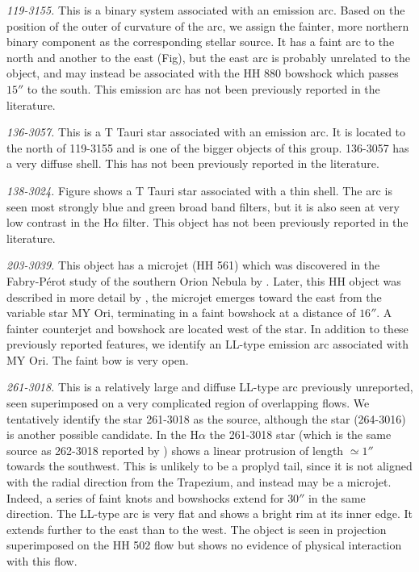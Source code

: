 \documentclass{article}
\newcommand\ha{\ensuremath{\mathrm{H}\alpha}}
\begin{document}
\textit{119-3155.} This is a binary system  associated with an emission arc. Based on the position of the outer of curvature of the arc, we assign the fainter, more northern binary component as the corresponding stellar source. It has a faint arc to the north and another to the east (Fig), but  the east arc is probably unrelated to the object, and may instead be associated with the HH 880 bowshock which passes \(15''\) to the south. This emission arc has not been previously reported in the literature.     

\textit{136-3057.} This is a T Tauri star associated with an emission arc. It is located to the north of 119-3155 and is one of the bigger objects of this group. 136-3057 has a very diffuse shell. This has not been previously reported in the literature.

\textit{138-3024.} Figure shows a T Tauri star associated with a thin shell. The arc is seen most strongly blue and green broad band filters, but it is also seen at very low contrast in the \ha{} filter. This object has not been previously reported in the literature.

\textit{203-3039.} This object has a microjet (HH 561) which was discovered in the Fabry-Pérot study of the southern Orion Nebula by \citet{Bally:2001}. Later, this HH object was described in more detail by \citet{Bally:2006a}, the microjet emerges toward the east from the variable star MY Ori, terminating in a faint bowshock at a distance of \(16''\). A fainter counterjet and bowshock are located west of the star. In addition to these previously reported features, we identify an LL-type emission arc associated with MY Ori. The faint bow is very open.

\textit{261-3018.} This is a relatively large and diffuse LL-type arc previously unreported, seen superimposed on a very complicated region of overlapping flows. We tentatively identify the star 261-3018 as the source, although the star (264-3016) is another possible candidate. In the \ha{} the 261-3018 star (which is the same source as 262-3018 reported by \citealp{Bally:2006a})  shows a linear protrusion of length \(\simeq1''\) towards the southwest. This is unlikely to be a proplyd tail, since it is not aligned with the radial direction from the Trapezium, and instead may be a microjet. Indeed, a series of faint knots and bowshocks extend for \(30''\) in the same direction. The LL-type arc is very flat and shows a bright rim at its inner edge. It extends further to the east than to the west. The object is seen in projection superimposed on the HH 502 flow but shows no evidence of physical interaction with this flow. 
\end{document}
